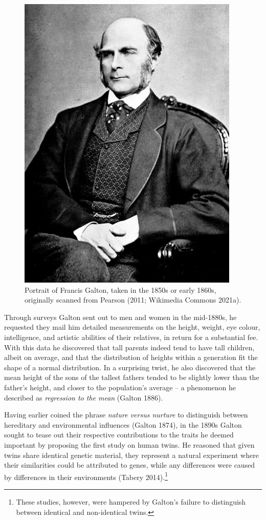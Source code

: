\documentclass[
]{book}
\begin{document}
\begin{figure}

{\centering \includegraphics[width=0.7\linewidth]{figs/introduction/Francis_Galton_1850s} 

}

\caption{Portrait of Francis Galton, taken in the 1850s or early 1860s, originally scanned from Pearson (2011; Wikimedia Commons 2021a).}\label{fig:galton}
\end{figure}

Through surveys Galton sent out to men and women in the mid-1880s, he requested they mail him detailed measurements on the height, weight, eye colour, intelligence, and artistic abilities of their relatives, in return for a substantial fee. With this data he discovered that tall parents indeed tend to have tall children, albeit on average, and that the distribution of heights within a generation fit the shape of a normal distribution. In a surprising twist, he also discovered that the mean height of the sons of the tallest fathers tended to be slightly lower than the father's height, and closer to the population's average -- a phenomenon he described as \emph{regression to the mean} (Galton 1886).

Having earlier coined the phrase \emph{nature versus nurture} to distinguish between hereditary and environmental influences (Galton 1874), in the 1890s Galton sought to tease out their respective contributions to the traits he deemed important by proposing the first study on human twins. He reasoned that given twins share identical genetic material, they represent a natural experiment where their similarities could be attributed to genes, while any differences were caused by differences in their environments (Tabery 2014).\footnote{These studies, however, were hampered by Galton's failure to distinguish between identical and non-identical twins.}
\end{document}
